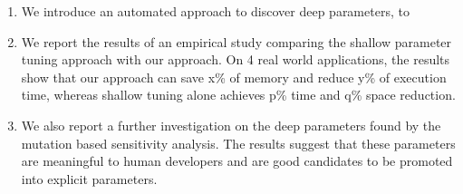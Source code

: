 \begin{enumerate}

\item We introduce an automated approach to discover deep parameters, to  

\item We report the results of an empirical study comparing the shallow parameter tuning approach with our approach. On 4 real world applications, the results show that our approach can save x\% of memory and reduce y\% of execution time, whereas shallow tuning alone achieves p\% time and q\% space reduction. 

\item We also report a further investigation on the deep parameters found by the mutation based sensitivity analysis. The results suggest that these parameters are meaningful to human developers and are good candidates to be promoted into explicit parameters. 

\end{enumerate}



